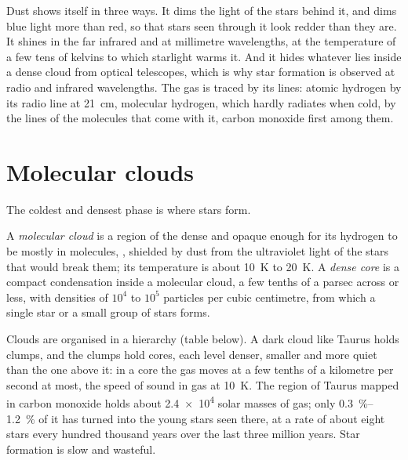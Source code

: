 Dust shows itself in three ways. It dims the light of the stars behind it,
and dims blue light more than red, so that stars seen through it look redder
than they are. It shines in the far infrared and at millimetre wavelengths,
at the temperature of a few tens of kelvins to which starlight warms it. And
it hides whatever lies inside a dense cloud from optical telescopes, which is
why star formation is observed at radio and infrared wavelengths. The gas is
traced by its lines: atomic hydrogen by its radio line at \qty{21}{cm},
molecular hydrogen, which hardly radiates when cold, by the lines of the
molecules that come with it, carbon monoxide first among them.

\section{Molecular clouds}

The coldest and densest phase is where stars form.

\begin{definition}
\label{def:b2:ism-star-formation:molecular-cloud}
A \emph{molecular cloud} is a region of the
 dense and opaque enough for its hydrogen to be mostly in
molecules, , shielded by dust from the ultraviolet light of the stars
that would break them; its temperature is about \qty{10}{K} to \qty{20}{K}. A
\emph{dense core} is a compact condensation inside a
molecular cloud, a few tenths of a parsec across or less, with densities of
$10^4$ to $10^5$ particles per cubic centimetre, from which a single star or a
small group of stars forms.
\end{definition}

Clouds are organised in a hierarchy (table below). A dark cloud like Taurus
holds clumps, and the clumps hold cores, each level denser, smaller and more
quiet than the one above it: in a core the gas moves at a few tenths of a
kilometre per second at most, the speed of sound in gas at \qty{10}{K}. The
region of Taurus mapped in carbon monoxide holds about \num{2.4e4} solar
masses of gas; only \qtyrange{0.3}{1.2}{\percent} of it has turned into the
young stars seen there, at a rate of about eight stars every hundred thousand
years over the last three million years. Star formation is slow and wasteful.

